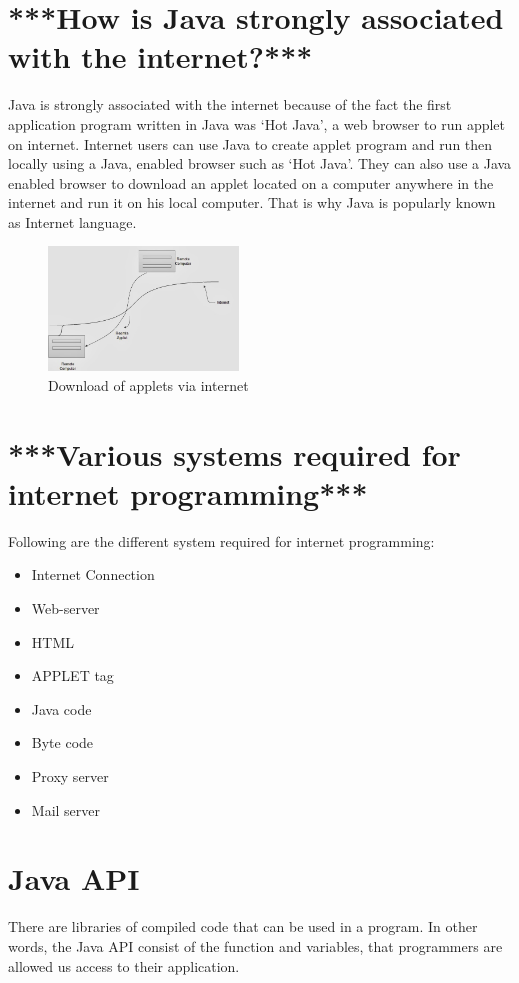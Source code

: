 \documentclass[twocolumn, a4paper]{article}
\begin{document}
\section{***How is Java strongly associated with the internet?***}
Java is strongly associated with the internet because of the fact the first
application program written in Java was `Hot Java', a web browser to run
applet on internet. Internet users can use Java to create applet program and
run then locally using a Java, enabled browser such as `Hot Java'. They can
also use a Java enabled browser to download an applet located on a computer
anywhere in the internet and run it on his local computer. That is why Java is
popularly known as Internet language.

\begin{figure}[h]
  \centering
  \includegraphics[width=0.45\textwidth]{javaassointernet}
  \caption{Download of applets via internet}
\end{figure}

\section{***Various systems required for internet programming***}
Following are the different system required for internet programming:
\begin{itemize}
  \item Internet Connection
  \item Web-server
  \item HTML
  \item APPLET tag
  \item Java code
  \item Byte code
  \item Proxy server
  \item Mail server
\end{itemize}

\section{Java API}
There are libraries of compiled code that can be used in a program. In other
words, the Java API consist of the function and variables, that programmers
are allowed us access to their application.
\end{document}
